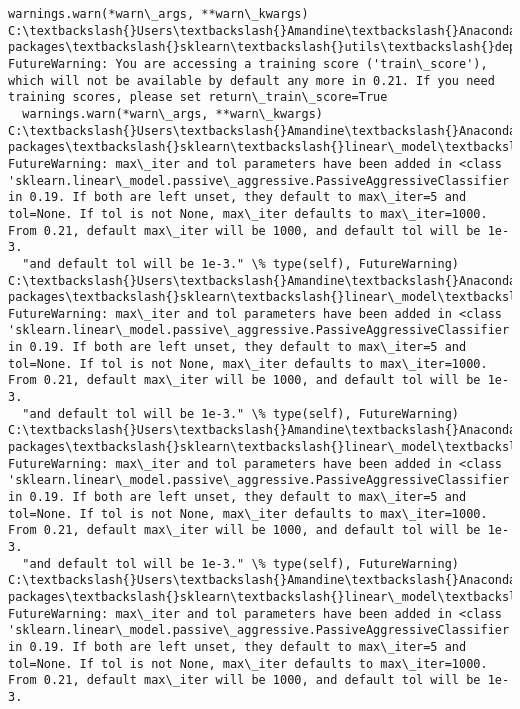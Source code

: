 \documentclass[11pt]{article}
\begin{document}
\begin{Verbatim}[commandchars=\\\{\}]
  warnings.warn(*warn\_args, **warn\_kwargs)
C:\textbackslash{}Users\textbackslash{}Amandine\textbackslash{}Anaconda3\textbackslash{}lib\textbackslash{}site-packages\textbackslash{}sklearn\textbackslash{}utils\textbackslash{}deprecation.py:122: FutureWarning: You are accessing a training score ('train\_score'), which will not be available by default any more in 0.21. If you need training scores, please set return\_train\_score=True
  warnings.warn(*warn\_args, **warn\_kwargs)
C:\textbackslash{}Users\textbackslash{}Amandine\textbackslash{}Anaconda3\textbackslash{}lib\textbackslash{}site-packages\textbackslash{}sklearn\textbackslash{}linear\_model\textbackslash{}stochastic\_gradient.py:128: FutureWarning: max\_iter and tol parameters have been added in <class 'sklearn.linear\_model.passive\_aggressive.PassiveAggressiveClassifier'> in 0.19. If both are left unset, they default to max\_iter=5 and tol=None. If tol is not None, max\_iter defaults to max\_iter=1000. From 0.21, default max\_iter will be 1000, and default tol will be 1e-3.
  "and default tol will be 1e-3." \% type(self), FutureWarning)
C:\textbackslash{}Users\textbackslash{}Amandine\textbackslash{}Anaconda3\textbackslash{}lib\textbackslash{}site-packages\textbackslash{}sklearn\textbackslash{}linear\_model\textbackslash{}stochastic\_gradient.py:128: FutureWarning: max\_iter and tol parameters have been added in <class 'sklearn.linear\_model.passive\_aggressive.PassiveAggressiveClassifier'> in 0.19. If both are left unset, they default to max\_iter=5 and tol=None. If tol is not None, max\_iter defaults to max\_iter=1000. From 0.21, default max\_iter will be 1000, and default tol will be 1e-3.
  "and default tol will be 1e-3." \% type(self), FutureWarning)
C:\textbackslash{}Users\textbackslash{}Amandine\textbackslash{}Anaconda3\textbackslash{}lib\textbackslash{}site-packages\textbackslash{}sklearn\textbackslash{}linear\_model\textbackslash{}stochastic\_gradient.py:128: FutureWarning: max\_iter and tol parameters have been added in <class 'sklearn.linear\_model.passive\_aggressive.PassiveAggressiveClassifier'> in 0.19. If both are left unset, they default to max\_iter=5 and tol=None. If tol is not None, max\_iter defaults to max\_iter=1000. From 0.21, default max\_iter will be 1000, and default tol will be 1e-3.
  "and default tol will be 1e-3." \% type(self), FutureWarning)
C:\textbackslash{}Users\textbackslash{}Amandine\textbackslash{}Anaconda3\textbackslash{}lib\textbackslash{}site-packages\textbackslash{}sklearn\textbackslash{}linear\_model\textbackslash{}stochastic\_gradient.py:128: FutureWarning: max\_iter and tol parameters have been added in <class 'sklearn.linear\_model.passive\_aggressive.PassiveAggressiveClassifier'> in 0.19. If both are left unset, they default to max\_iter=5 and tol=None. If tol is not None, max\_iter defaults to max\_iter=1000. From 0.21, default max\_iter will be 1000, and default tol will be 1e-3.

\end{Verbatim}
\end{document}
